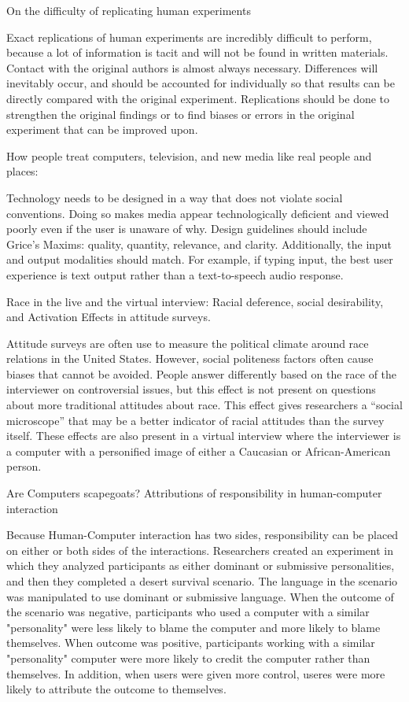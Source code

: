 On the difficulty of replicating human experiments

Exact replications of human experiments are incredibly difficult to perform, because a lot of information is tacit and will not be found in written materials.  Contact with the original authors is almost always necessary.  Differences will inevitably occur, and should be accounted for individually so that results can be directly compared with the original experiment.  Replications should be done to strengthen the original findings or to find biases or errors in the original experiment that can be improved upon.   

How people treat computers, television, and new media like real people and places:

Technology needs to be designed in a way that does not violate social conventions.  Doing so makes media appear technologically deficient and viewed poorly even if the user is unaware of why.  Design guidelines should include Grice’s Maxims: quality, quantity, relevance, and clarity.  Additionally, the input and output modalities should match.  For example, if typing input, the best user experience is text output rather than a text-to-speech audio response.


Race in the live and the virtual interview: Racial deference, social desirability, and Activation Effects in attitude surveys.

Attitude surveys are often use to measure the political climate around race relations in the United States.  However, social politeness factors often cause biases that cannot be avoided.  People answer differently based on the race of the interviewer on controversial issues, but this effect is not present on questions about more traditional attitudes about race.  This effect gives researchers a “social microscope” that may be a better indicator of racial attitudes than the survey itself.  These effects are also present in a virtual interview where the interviewer is a computer with a personified image of either a Caucasian or African-American person. 


Are Computers scapegoats?  Attributions of responsibility in human-computer interaction

Because Human-Computer interaction has two sides, responsibility can be placed on either or both sides of the interactions.  Researchers created an experiment in which they analyzed participants as either dominant or submissive personalities, and then they completed a desert survival scenario.  The language in the scenario was manipulated to use dominant or submissive language.  When the outcome of the scenario was negative, participants who used a computer with a similar "personality" were less likely to blame the computer and more likely to blame themselves.  When outcome was positive, participants working with a similar "personality" computer were more likely to credit the computer rather than themselves.  In addition, when users were given more control, useres were more likely to attribute the outcome to themselves.  